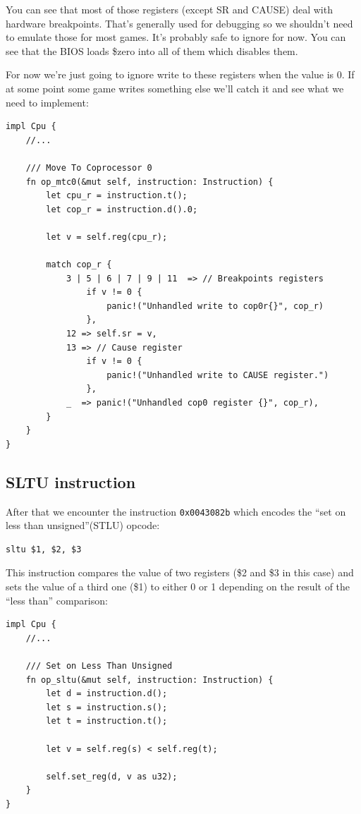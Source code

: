 \documentclass[a4paper]{article}
\newcommand{\code}[1] {\texttt{#1}}
\begin{document}
You can see that most of those registers (except SR and CAUSE) deal
with hardware breakpoints. That's generally used for debugging so we
shouldn't need to emulate those for most games. It's probably safe to
ignore for now. You can see that the BIOS loads \$zero into all of
them which disables them.

For now we're just going to ignore write to these registers when the
value is 0. If at some point some game writes something else we'll
catch it and see what we need to implement:

\begin{lstlisting}
impl Cpu {
    //...

    /// Move To Coprocessor 0
    fn op_mtc0(&mut self, instruction: Instruction) {
        let cpu_r = instruction.t();
        let cop_r = instruction.d().0;

        let v = self.reg(cpu_r);

        match cop_r {
            3 | 5 | 6 | 7 | 9 | 11  => // Breakpoints registers
                if v != 0 {
                    panic!("Unhandled write to cop0r{}", cop_r)
                },
            12 => self.sr = v,
            13 => // Cause register
                if v != 0 {
                    panic!("Unhandled write to CAUSE register.")
                },
            _  => panic!("Unhandled cop0 register {}", cop_r),
        }
    }
}
\end{lstlisting}

\subsection{SLTU instruction}

After that we encounter the instruction \code{0x0043082b} which
encodes the ``set on less than unsigned''(STLU) opcode:

\begin{lstlisting}[language=assembly]
sltu $1, $2, $3
\end{lstlisting}

This instruction compares the value of two registers (\$2 and \$3 in
this case) and sets the value of a third one (\$1) to either 0 or 1
depending on the result of the ``less than'' comparison:

\begin{lstlisting}
impl Cpu {
    //...

    /// Set on Less Than Unsigned
    fn op_sltu(&mut self, instruction: Instruction) {
        let d = instruction.d();
        let s = instruction.s();
        let t = instruction.t();

        let v = self.reg(s) < self.reg(t);

        self.set_reg(d, v as u32);
    }
}
\end{lstlisting}
\end{document}
